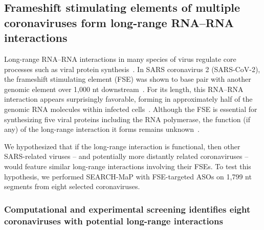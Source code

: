 \documentclass[main.tex]{subfiles}
\begin{document}
\subsection{Frameshift stimulating elements of multiple coronaviruses form long-range RNA--RNA interactions}

Long-range RNA--RNA interactions in many species of virus regulate core processes such as viral protein synthesis~\cite{Nicholson2014}.
In SARS coronavirus 2 (SARS-CoV-2), the frameshift stimulating element (FSE) was shown to base pair with another genomic element over 1,000 nt downstream~\cite{Ziv2020}.
For its length, this RNA--RNA interaction appears surprisingly favorable, forming in approximately half of the genomic RNA molecules within infected cells~\cite{Lan2022}.
Although the FSE is essential for synthesizing five viral proteins including the RNA polymerase, the function (if any) of the long-range interaction it forms remains unknown~\cite{Allan2023}.

We hypothesized that if the long-range interaction is functional, then other SARS-related viruses -- and potentially more distantly related coronaviruses -- would feature similar long-range interactions involving their FSEs.
To test this hypothesis, we performed SEARCH-MaP with FSE-targeted ASOs on 1,799 nt segments from eight selected coronaviruses.


\subsubsection{Computational and experimental screening identifies eight coronaviruses with potential long-range interactions}
\end{document}
